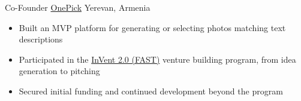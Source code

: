 \documentclass[10pt,a4paper,sans]{moderncv}        %
\newcommand{\yerevan}{Yerevan, Armenia}
\begin{document}
{Co-Founder}
{\href{https://www.crunchbase.com/organization/onepick-me\#overview}{OnePick}}
{\yerevan}
{}
{
  \begin{itemize}
    \item Built an MVP platform for generating or selecting photos matching text descriptions
    \item Participated in the \href{https://fast.foundation/en/program/857/2023/general-information}{InVent 2.0 (FAST)} venture building program, from idea generation to pitching
    \item Secured initial funding and continued development beyond the program
  \end{itemize}
} %

\end{document}
